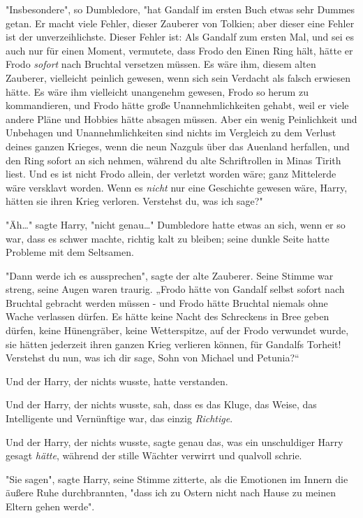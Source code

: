 {"Insbesondere", so Dumbledore, "hat Gandalf im ersten Buch etwas sehr Dummes getan. Er macht viele Fehler, dieser Zauberer von Tolkien; aber dieser eine Fehler ist der unverzeihlichste. Dieser Fehler ist: Als Gandalf zum ersten Mal, und sei es auch nur für einen Moment, vermutete, dass Frodo den Einen Ring hält, hätte er Frodo \emph{sofort} nach Bruchtal versetzen müssen. Es wäre ihm, diesem alten Zauberer, vielleicht peinlich gewesen, wenn sich sein Verdacht als falsch erwiesen hätte. Es wäre ihm vielleicht unangenehm gewesen, Frodo so herum zu kommandieren, und Frodo hätte große Unannehmlichkeiten gehabt, weil er viele andere Pläne und Hobbies hätte absagen müssen. Aber ein wenig Peinlichkeit und Unbehagen und Unannehmlichkeiten sind nichts im Vergleich zu dem Verlust deines ganzen Krieges, wenn die neun Nazguls über das Auenland herfallen, und den Ring sofort an sich nehmen, während du alte Schriftrollen in Minas Tirith liest. Und es ist nicht Frodo allein, der verletzt worden wäre; ganz Mittelerde wäre versklavt worden. Wenn es \emph{nicht} nur eine Geschichte gewesen wäre, Harry, hätten sie ihren Krieg verloren. Verstehst du, was ich sage?"

"Äh…" sagte Harry, "nicht genau…" Dumbledore hatte etwas an sich, wenn er so war, dass es schwer machte, richtig kalt zu bleiben; seine dunkle Seite hatte Probleme mit dem Seltsamen.

"Dann werde ich es aussprechen", sagte der alte Zauberer. Seine Stimme war streng, seine Augen waren traurig. „Frodo hätte von Gandalf selbst sofort nach Bruchtal gebracht werden müssen - und Frodo hätte Bruchtal niemals ohne Wache verlassen dürfen. Es hätte keine Nacht des Schreckens in Bree geben dürfen, keine Hünengräber, keine Wetterspitze, auf der Frodo verwundet wurde, sie hätten jederzeit ihren ganzen Krieg verlieren können, für Gandalfs Torheit! Verstehst du nun, was ich dir sage, Sohn von Michael und Petunia?“

Und der Harry, der nichts wusste, hatte verstanden.

Und der Harry, der nichts wusste, sah, dass es das Kluge, das Weise, das Intelligente und Vernünftige war, das einzig \emph{Richtige}.

Und der Harry, der nichts wusste, sagte genau das, was ein unschuldiger Harry gesagt \emph{hätte}, während der stille Wächter verwirrt und qualvoll schrie.

"Sie sagen", sagte Harry, seine Stimme zitterte, als die Emotionen im Innern die äußere Ruhe durchbrannten, "dass ich zu Ostern nicht nach Hause zu meinen Eltern gehen werde".

}
